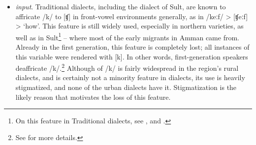 \documentclass[output=paper]{langsci/langscibook}
\begin{document}
\begin{itemize}
\item[] \textit{ input}. Traditional  dialects, including the dialect of Sult, are known to affricate /k/ to [ʧ] in front-vowel environments generally, as in /keːf/ > [ʧeːf] > ‘how’. This feature is still widely used, especially in northern varieties, as well as in Sult\footnote{On this feature in Traditional  dialects, see \citet{Al-Hawamdeh2015}, \citet{Herin2010} and  \citet{HerinAl-wer2013}.} – where most of the early migrants in Amman came from. Already in the first generation, this feature is completely lost; all instances of this variable were rendered with [k]. In other words, first-generation speakers deaffricate /k/.\footnote{See \citet{Al-Wer2007} for more details.} Although   of /k/ is fairly widespread in the region’s rural dialects, and is certainly not a minority feature in  dialects, its use is heavily stigmatized, and none of the urban dialects have it. Stigmatization is the likely reason that motivates the loss of this feature.


\end{itemize}
\end{document}
